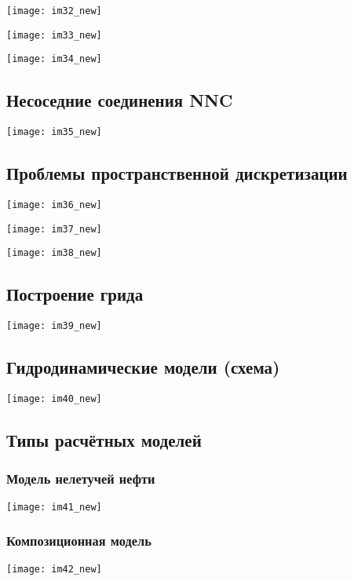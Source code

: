 \documentclass[main.tex]{subfiles}
\begin{document}
\texttt{[image: im32\_new]}

\texttt{[image: im33\_new]}

\texttt{[image: im34\_new]}

\subsection{Несоседние соединения NNC}

\texttt{[image: im35\_new]}

\subsection{Проблемы пространственной дискретизации}

\texttt{[image: im36\_new]}

\texttt{[image: im37\_new]}

\texttt{[image: im38\_new]}

\subsection{Построение грида}

\texttt{[image: im39\_new]}

\subsection{Гидродинамические модели (схема)}

\texttt{[image: im40\_new]}

\subsection{Типы расчётных моделей}

\subsubsection{Модель нелетучей нефти}

\texttt{[image: im41\_new]}

\subsubsection{Композиционная модель}

\texttt{[image: im42\_new]}
\end{document}
